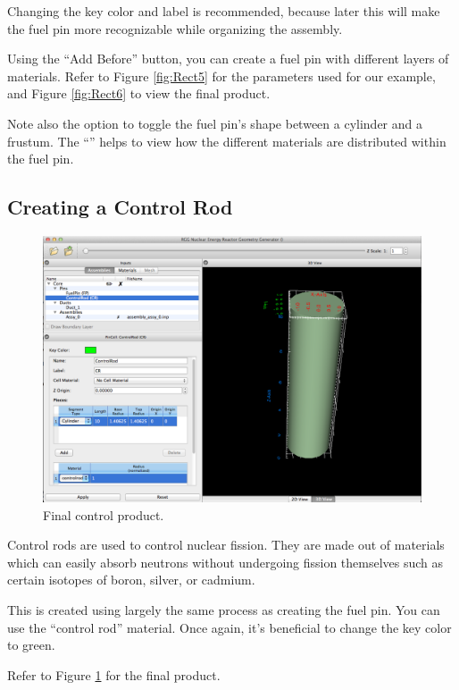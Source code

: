 Changing the key color and label is recommended, because later this will make the fuel pin more recognizable while organizing the assembly.


Using the ``Add Before'' button, you can create a fuel pin with different layers of materials.  Refer to Figure \ref{fig:Rect5} for the parameters used for our example, and Figure \ref{fig:Rect6} to view the final product.

Note also the option to toggle the fuel pin's shape between a cylinder and a frustum.  The ``'' helps to view how the different materials are distributed within the fuel pin.

\subsection{Creating a Control Rod}
\begin{figure}
  \vspace{-20pt}
  \begin{center}
    \includegraphics[width=0.8\linewidth]{Images/rect-control-rod.png}
  \end{center}
  \caption{Final control product.}
  \label{fig:Rect7}
  \vspace{-40pt}
\end{figure}

Control rods are used to control nuclear fission. They are made out of materials which can easily absorb neutrons without undergoing fission themselves such as certain isotopes of boron, silver, or cadmium.

This is created using largely the same process as creating the fuel pin.  You can use the ``control rod'' material.  Once again, it's beneficial to change the key color to green.

Refer to Figure \ref{fig:Rect7} for the final product.

